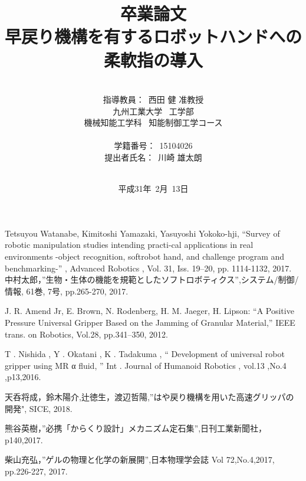 \documentclass[a4paper,12pt]{jarticle}
\title{卒業論文\\
早戻り機構を有するロボットハンドへの柔軟指の導入\\
}
\author{\vspace{90mm}\\
指導教員：\ 西田 \hspace{0mm} 健 准教授\\
九州工業大学\ \hspace{0mm} 工学部\\
機械知能工学科\ \hspace{0mm} 知能制御工学コース \\
\vspace{0mm}\\
学籍番号：\ 15104026\\
提出者氏名：\ 川崎 \hspace{0mm} 雄太朗\\\vspace{5mm}\\ }
\date{平成31年\ 2月\ 13日}
\begin{document}
\titlepage
\maketitle
\thispagestyle{empty}
\newpage

\thispagestyle{empty}

\newpage
\tableofcontents

\newpage

\newpage
%
\newpage

\newpage

\newpage

\newpage





\begin{thebibliography}{99}

 Tetsuyou Watanabe, Kimitoshi Yamazaki, Yasuyoshi Yokoko-hji, “Survey of robotic manipulation studies intending practi-cal applications in real environments -object recognition, softrobot hand, and challenge program and benchmarking-” , Advanced Robotics , Vol. 31, Iss. 19–20, pp. 1114-1132, 2017.
 中村太郎，”生物・生体の機能を規範としたソフトロボティクス”,システム/制御/情報, 61巻, 7号, pp.265-270, 2017.

J. R. Amend Jr, E. Brown, N. Rodenberg, H. M. Jaeger, H. Lipson: “A Positive Pressure
Universal Gripper Based on the Jamming of Granular Material,” IEEE trans. on Robotics,
Vol.28, pp.341–350, 2012.

T . Nishida , Y . Okatani , K . Tadakuma ,
“ Development of universal robot gripper using
MR α fluid, ” Int . Journal of Humanoid Robotics , vol.13 ,No.4 ,p13,2016.

 天呑将成，鈴木陽介,辻徳生，渡辺哲陽,”はや戻り機構を用いた高速グリッパの開発", SICE, 2018.

 熊谷英樹，”必携「からくり設計」メカニズム定石集”,日刊工業新聞社，p140,2017.

 柴山充弘，”ゲルの物理と化学の新展開”,日本物理学会誌 Vol 72,No.4,2017, pp.226-227, 2017.








  



\end{thebibliography}
\end{document}
